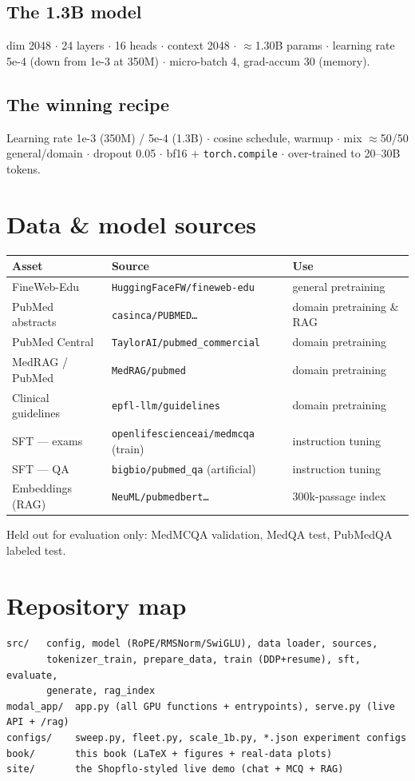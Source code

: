 \section{The 1.3B model}
dim 2048 $\cdot$ 24 layers $\cdot$ 16 heads $\cdot$ context 2048 $\cdot$ $\approx$1.30B params $\cdot$
learning rate 5e-4 (down from 1e-3 at 350M) $\cdot$ micro-batch 4, grad-accum 30 (memory).

\section{The winning recipe}
Learning rate 1e-3 (350M) / 5e-4 (1.3B) $\cdot$ cosine schedule, warmup $\cdot$ mix $\approx$50/50 general/domain
$\cdot$ dropout 0.05 $\cdot$ bf16 $+$ \texttt{torch.compile} $\cdot$ over-trained to 20--30B tokens.

\chapter{Data \& model sources}
\begin{center}\small
\begin{tabular}{@{}lll@{}}
\toprule
\textbf{Asset} & \textbf{Source} & \textbf{Use}\\
\midrule
FineWeb-Edu & \texttt{HuggingFaceFW/fineweb-edu} & general pretraining\\
PubMed abstracts & \texttt{casinca/PUBMED\ldots} & domain pretraining \& RAG\\
PubMed Central & \texttt{TaylorAI/pubmed\_commercial} & domain pretraining\\
MedRAG / PubMed & \texttt{MedRAG/pubmed} & domain pretraining\\
Clinical guidelines & \texttt{epfl-llm/guidelines} & domain pretraining\\
SFT --- exams & \texttt{openlifescienceai/medmcqa} (train) & instruction tuning\\
SFT --- QA & \texttt{bigbio/pubmed\_qa} (artificial) & instruction tuning\\
Embeddings (RAG) & \texttt{NeuML/pubmedbert\ldots} & 300k-passage index\\
\bottomrule
\end{tabular}
\end{center}
\noindent Held out for evaluation only: MedMCQA validation, MedQA test, PubMedQA labeled test.

\chapter{Repository map}
\begin{lstlisting}
src/   config, model (RoPE/RMSNorm/SwiGLU), data loader, sources,
       tokenizer_train, prepare_data, train (DDP+resume), sft, evaluate,
       generate, rag_index
modal_app/  app.py (all GPU functions + entrypoints), serve.py (live API + /rag)
configs/    sweep.py, fleet.py, scale_1b.py, *.json experiment configs
book/       this book (LaTeX + figures + real-data plots)
site/       the Shopflo-styled live demo (chat + MCQ + RAG)
\end{lstlisting}

